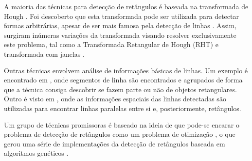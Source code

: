 A maioria das técnicas para detecção de retângulos é baseada na transformada de Hough \cite{houghintro00}. Foi descoberto que esta transformada pode ser utilizada para detectar formas arbitrárias, apesar de ser mais famosa pela detecção de linhas \cite{houghgeral}. Assim, surgiram inúmeras variações da transformada visando resolver exclusivamente este problema, tal como a Transformada Retangular de Hough (RHT) \cite{houghrectangle} e transformada com janelas \cite{hough00}.

Outras técnicas envolvem análise de informações básicas de linhas. Um exemplo é encontrado em \cite{primitivas}, onde segmentos de linha são encontrados e agrupados de forma que a técnica consiga descobrir se fazem parte ou não de objetos retangulares. Outro é visto em \cite{primitivas00}, onde as informações espaciais das linhas detectadas são utilizadas para encontrar linhas paralelas entre si e, posteriormente, retângulos.

Um grupo de técnicas promissoras é baseado na ideia de que pode-se encarar o problema de detecção de retângulos como um problema de otimização \cite{rectgenetic00}, o que gerou uma série de implementações da detecção de retângulos baseada em algoritmos genéticos 
\cite{rectgenetic01,rectgenetic02}.


